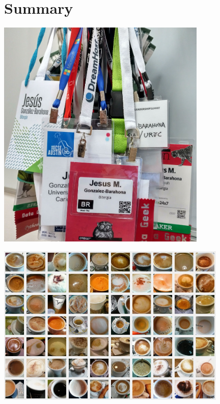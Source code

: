 \documentclass[17pt,aspectratio=169,hyperref=pdfusetitle]{beamer}
\begin{document}
\section{Summary}


\begin{frame}[fragile]

  \begin{center}
  \includegraphics[width=10cm]{figs/badges}
  \end{center}  
  
\end{frame}

\begin{frame}[fragile]

  \begin{center}
  \includegraphics[width=11cm]{figs/coffees}
  \end{center}  
  
\end{frame}
\end{document}
